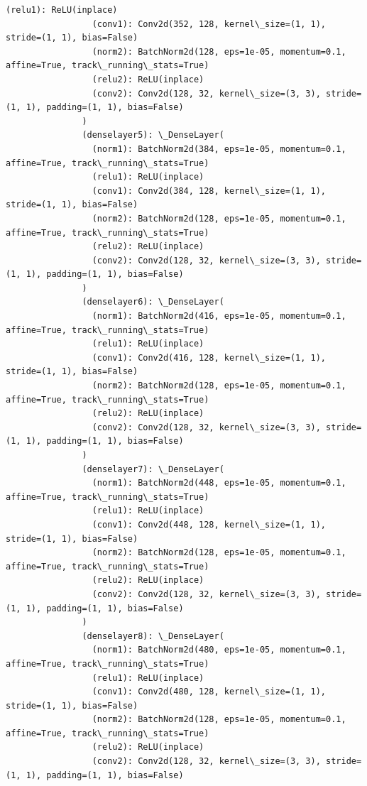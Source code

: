 \documentclass[11pt]{article}
\begin{document}
\begin{Verbatim}[commandchars=\\\{\}]
                 (relu1): ReLU(inplace)
                 (conv1): Conv2d(352, 128, kernel\_size=(1, 1), stride=(1, 1), bias=False)
                 (norm2): BatchNorm2d(128, eps=1e-05, momentum=0.1, affine=True, track\_running\_stats=True)
                 (relu2): ReLU(inplace)
                 (conv2): Conv2d(128, 32, kernel\_size=(3, 3), stride=(1, 1), padding=(1, 1), bias=False)
               )
               (denselayer5): \_DenseLayer(
                 (norm1): BatchNorm2d(384, eps=1e-05, momentum=0.1, affine=True, track\_running\_stats=True)
                 (relu1): ReLU(inplace)
                 (conv1): Conv2d(384, 128, kernel\_size=(1, 1), stride=(1, 1), bias=False)
                 (norm2): BatchNorm2d(128, eps=1e-05, momentum=0.1, affine=True, track\_running\_stats=True)
                 (relu2): ReLU(inplace)
                 (conv2): Conv2d(128, 32, kernel\_size=(3, 3), stride=(1, 1), padding=(1, 1), bias=False)
               )
               (denselayer6): \_DenseLayer(
                 (norm1): BatchNorm2d(416, eps=1e-05, momentum=0.1, affine=True, track\_running\_stats=True)
                 (relu1): ReLU(inplace)
                 (conv1): Conv2d(416, 128, kernel\_size=(1, 1), stride=(1, 1), bias=False)
                 (norm2): BatchNorm2d(128, eps=1e-05, momentum=0.1, affine=True, track\_running\_stats=True)
                 (relu2): ReLU(inplace)
                 (conv2): Conv2d(128, 32, kernel\_size=(3, 3), stride=(1, 1), padding=(1, 1), bias=False)
               )
               (denselayer7): \_DenseLayer(
                 (norm1): BatchNorm2d(448, eps=1e-05, momentum=0.1, affine=True, track\_running\_stats=True)
                 (relu1): ReLU(inplace)
                 (conv1): Conv2d(448, 128, kernel\_size=(1, 1), stride=(1, 1), bias=False)
                 (norm2): BatchNorm2d(128, eps=1e-05, momentum=0.1, affine=True, track\_running\_stats=True)
                 (relu2): ReLU(inplace)
                 (conv2): Conv2d(128, 32, kernel\_size=(3, 3), stride=(1, 1), padding=(1, 1), bias=False)
               )
               (denselayer8): \_DenseLayer(
                 (norm1): BatchNorm2d(480, eps=1e-05, momentum=0.1, affine=True, track\_running\_stats=True)
                 (relu1): ReLU(inplace)
                 (conv1): Conv2d(480, 128, kernel\_size=(1, 1), stride=(1, 1), bias=False)
                 (norm2): BatchNorm2d(128, eps=1e-05, momentum=0.1, affine=True, track\_running\_stats=True)
                 (relu2): ReLU(inplace)
                 (conv2): Conv2d(128, 32, kernel\_size=(3, 3), stride=(1, 1), padding=(1, 1), bias=False)

\end{Verbatim}
\end{document}
